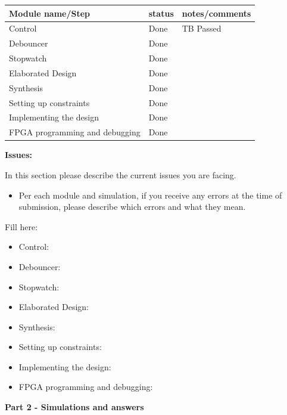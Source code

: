 \documentclass[11pt,a4paper]{article}
\newcommand{\fillrow}{\rule[-0.9em]{0pt}{2.4em}}
\begin{document}
\vspace{0.5em}
\begin{tabularx}{\textwidth}{|p{3.8cm}|p{3cm}|X|}
\hline
Module name/Step & status & notes/comments \\ \hline
\fillrow Control                       & Done & TB Passed \\ \hline
\fillrow Debouncer                     & Done & \\ \hline
\fillrow Stopwatch                     & Done & \\ \hline
\fillrow Elaborated Design             & Done & \\ \hline
\fillrow Synthesis                     & Done & \\ \hline
\fillrow Setting up constraints        & Done & \\ \hline
\fillrow Implementing the design       & Done & \\ \hline
\fillrow FPGA programming and debugging & Done & \\ \hline
\end{tabularx}

\vspace{1.5em}
\textbf{Issues:}

In this section please describe the current issues you are facing.
\begin{itemize}[noitemsep,topsep=2pt]
  \item Per each module and simulation, if you receive any errors at the time of submission, please describe which errors and what they mean.
\end{itemize}

Fill here:
\begin{itemize}[topsep=2pt]
  \item Control:
  \item Debouncer:
  \item Stopwatch:
  \item Elaborated Design:
  \item Synthesis:
  \item Setting up constraints:
  \item Implementing the design:
  \item FPGA programming and debugging:
\end{itemize}

\vspace{1.5em}

{\fontsize{14}{17}\selectfont \textbf{Part 2 - Simulations and answers}}
\end{document}
